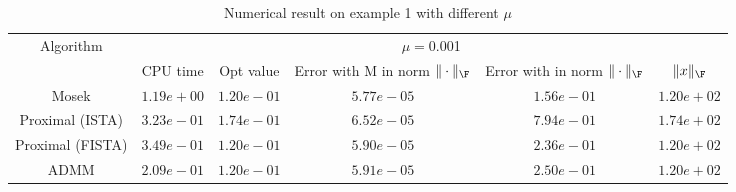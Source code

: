 \begin{table}
\centering
\begin{tabular}{|c|c|c|c|c|c|}

\hline
\multirow{2}{*}{ Algorithm} &\multicolumn{5}{c|}{$\mu=$0.001}\\\cline{2-6}
 &CPU time &Opt value &Error with M in norm $\|\cdot\|_\F$ &Error with in norm $\|\cdot\|_\F$ &$\|x\|_\F$\\\hline
Mosek & $1.19e+00$ & $1.20e-01$ & $5.77e-05$ & $1.56e-01$ & $1.20e+02$\\\hline
Proximal (ISTA) & $3.23e-01$ & $1.74e-01$ & $6.52e-05$ & $7.94e-01$ & $1.74e+02$\\\hline
Proximal (FISTA) & $3.49e-01$ & $1.20e-01$ & $5.90e-05$ & $2.36e-01$ & $1.20e+02$\\\hline
ADMM & $2.09e-01$ & $1.20e-01$ & $5.91e-05$ & $2.50e-01$ & $1.20e+02$\\\hline
\end{tabular}
\caption{Numerical result on example 1 with different $\mu$\label{example1}}
\end{table}

